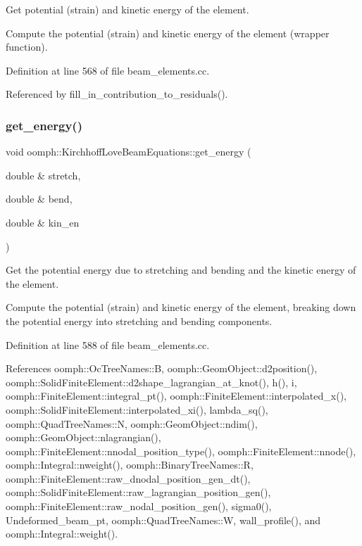 Get potential (strain) and kinetic energy of the element. 

Compute the potential (strain) and kinetic energy of the element (wrapper function). 

Definition at line 568 of file beam\+\_\+elements.\+cc.



Referenced by fill\+\_\+in\+\_\+contribution\+\_\+to\+\_\+residuals().

\mbox{\label{classoomph_1_1KirchhoffLoveBeamEquations_ae003c588ad4e314538fcd04c9289a702}} 
\subsubsection{\texorpdfstring{get\+\_\+energy()}{get\_energy()}\hspace{0.1cm}{\footnotesize\ttfamily [2/2]}}
{\footnotesize\ttfamily void oomph\+::\+Kirchhoff\+Love\+Beam\+Equations\+::get\+\_\+energy (\begin{DoxyParamCaption}\item[{double \&}]{stretch,  }\item[{double \&}]{bend,  }\item[{double \&}]{kin\+\_\+en }\end{DoxyParamCaption})}



Get the potential energy due to stretching and bending and the kinetic energy of the element. 

Compute the potential (strain) and kinetic energy of the element, breaking down the potential energy into stretching and bending components. 

Definition at line 588 of file beam\+\_\+elements.\+cc.



References oomph\+::\+Oc\+Tree\+Names\+::B, oomph\+::\+Geom\+Object\+::d2position(), oomph\+::\+Solid\+Finite\+Element\+::d2shape\+\_\+lagrangian\+\_\+at\+\_\+knot(), h(), i, oomph\+::\+Finite\+Element\+::integral\+\_\+pt(), oomph\+::\+Finite\+Element\+::interpolated\+\_\+x(), oomph\+::\+Solid\+Finite\+Element\+::interpolated\+\_\+xi(), lambda\+\_\+sq(), oomph\+::\+Quad\+Tree\+Names\+::N, oomph\+::\+Geom\+Object\+::ndim(), oomph\+::\+Geom\+Object\+::nlagrangian(), oomph\+::\+Finite\+Element\+::nnodal\+\_\+position\+\_\+type(), oomph\+::\+Finite\+Element\+::nnode(), oomph\+::\+Integral\+::nweight(), oomph\+::\+Binary\+Tree\+Names\+::R, oomph\+::\+Finite\+Element\+::raw\+\_\+dnodal\+\_\+position\+\_\+gen\+\_\+dt(), oomph\+::\+Solid\+Finite\+Element\+::raw\+\_\+lagrangian\+\_\+position\+\_\+gen(), oomph\+::\+Finite\+Element\+::raw\+\_\+nodal\+\_\+position\+\_\+gen(), sigma0(), Undeformed\+\_\+beam\+\_\+pt, oomph\+::\+Quad\+Tree\+Names\+::W, wall\+\_\+profile(), and oomph\+::\+Integral\+::weight().

